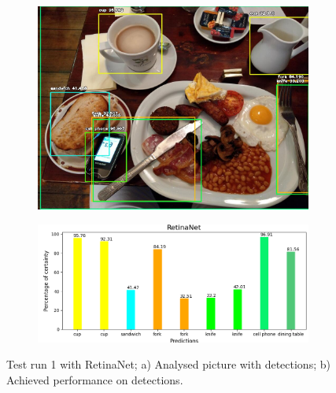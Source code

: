       \begin{figure}[H]
        \centering
        \captionsetup{justification=centering}

        \begin{subfigure}{0.29\textwidth}
        \includegraphics[width=\textwidth]{Sections/4InitialWork/4_images_obj_run1/retinaNet.jpg} 
        \caption{}
        \end{subfigure}
        \begin{subfigure}{0.65\textwidth}
        \includegraphics[width=\textwidth]{Sections/4InitialWork/4_images_obj_run1/retinaNet_graph.png}
        \caption{}
        \end{subfigure}
        
        \caption{ 
        Test run 1 with RetinaNet; a) Analysed picture with detections; b) Achieved performance on detections. }
        \end{figure}
    

